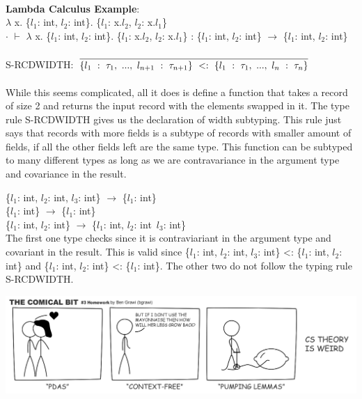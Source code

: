 \documentclass[9pt]{extarticle} %
\newcommand{\cmark}{\ding{51}}%
\newcommand{\xmark}{\ding{55}}%
\begin{document}
\begin{minipage}[t]{.61\linewidth}
\\
\textbf{Lambda Calculus Example}: \\
$\lambda$ x. \{$l_1$: int, $l_2$: int\}. \{$l_1$: x.$l_2$, $l_2$: x.$l_1$\} \\
$\cdot$ $\vdash$ $\lambda$ x. \{$l_1$: int, $l_2$: int\}. \{$l_1$: x.$l_2$, $l_2$: x.$l_1$\} : \{$l_1$: int, $l_2$: int\} $\rightarrow$ \{$l_1$: int, $l_2$: int\}  \\
\\
S-RCDWIDTH: 
$\infer{\{l_1\ :\ \tau_1,\ ...,\ l_{n+1}\ :\ \tau_{n+1}\}\ <:\ \{l_1\ :\ \tau_1,\ ...,\ l_n\ :\ \tau_n\}}{}$ \\
\\
While this seems complicated, all it does is define a function that takes a record
of size 2 and returns the input record with the elements swapped in it. The type 
rule S-RCDWIDTH gives us the declaration of width subtyping. This rule just says
that records with more fields is a subtype of records with smaller amount of fields,
if all the other fields left are the same type. This function can be subtyped to 
many different types as long as we are contravariance in the argument type and covariance in the result. 

\cmark \{$l_1$: int, $l_2$: int, $l_3$: int\} $\rightarrow$ \{$l_1$: int\} \\
\xmark \{$l_1$: int\} $\rightarrow$ \{$l_1$: int\} \\
\xmark \{$l_1$: int, $l_2$: int\} $\rightarrow$ \{$l_1$: int, $l_2$: int\, $l_3$: int\}  \\
The first one type checks since it is contraviariant in the argument type and
covariant in the result. This is valid since
\{$l_1$: int, $l_2$: int, $l_3$: int\} <: \{$l_1$: int, $l_2$: int\} and 
\{$l_1$: int, $l_2$: int\} <: \{$l_1$: int\}. The other two do not follow the
typing rule S-RCDWIDTH. 

\includegraphics[width=\linewidth]{imgs/cstheory.png} 
\end{minipage} %
\end{document}
